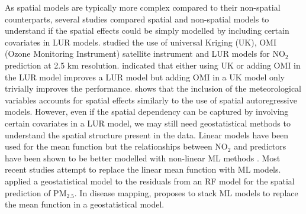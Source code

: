 \documentclass{article}
\begin{document}

As spatial models are typically more complex compared to their non-spatial counterparts, several studies compared spatial and non-spatial models to understand if the spatial effects could be simply modelled by including certain covariates in LUR models. \cite{young2016satellite} studied the use of universal Kriging (UK), OMI (Ozone Monitoring Instrument) satellite instrument \citep{OMI} and LUR models for NO$_2$ prediction at 2.5 km resolution. \cite{young2016satellite} indicated that either using UK or adding OMI in the LUR model improves a LUR model but adding OMI in a UK model only trivially improves the performance. \cite{BERTAZZON20159} shows that the inclusion of the meteorological variables accounts for spatial effects similarly to the use of spatial autoregressive models\citep{anselin2001spatial}. However, even if the spatial dependency can be captured by involving certain covariates in a LUR model, we may still need geostatistical methods to understand the spatial structure present in the data. Linear models have been used for the mean function but the relationships between NO$_2$ and predictors have been shown to be better modelled with non-linear ML methods \citep{luglobal}. Most recent studies attempt to replace the linear mean function with ML models. \cite{liu2020integrate} applied a geostatistical model to the residuals from an RF model for the spatial prediction of PM$_{2.5}$. In disease mapping, \cite{stackinla} proposes to stack ML models to replace the mean function in a geostatistical model. 
\end{document}
